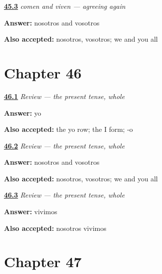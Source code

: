 \noindent\begin{minipage}[t]{\linewidth}
\raggedright
\hyperlink{review-ES-C07-comen-viven-where}{\textbf{45.3}} \emph{comen and viven — agreeing again}\par
\small \textbf{Answer:} nosotros and vosotros\par
\footnotesize \textbf{Also accepted:} nosotros, vosotros; we and you all
\end{minipage}\par\medskip

\section*{Chapter 46}

\noindent\begin{minipage}[t]{\linewidth}
\raggedright
\hyperlink{review-ES-C07-repaso-tres-familias-yo}{\textbf{46.1}} \emph{Review — the present tense, whole}\par
\small \textbf{Answer:} yo\par
\footnotesize \textbf{Also accepted:} the yo row; the I form; -o
\end{minipage}\par\medskip

\noindent\begin{minipage}[t]{\linewidth}
\raggedright
\hyperlink{review-ES-C07-repaso-tres-familias-diff}{\textbf{46.2}} \emph{Review — the present tense, whole}\par
\small \textbf{Answer:} nosotros and vosotros\par
\footnotesize \textbf{Also accepted:} nosotros, vosotros; we and you all
\end{minipage}\par\medskip

\noindent\begin{minipage}[t]{\linewidth}
\raggedright
\hyperlink{review-ES-C07-repaso-tres-familias-live}{\textbf{46.3}} \emph{Review — the present tense, whole}\par
\small \textbf{Answer:} vivimos\par
\footnotesize \textbf{Also accepted:} nosotros vivimos
\end{minipage}\par\medskip

\section*{Chapter 47}

